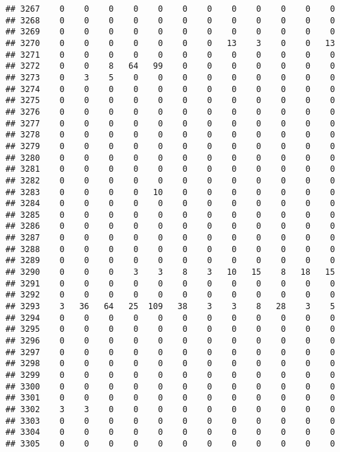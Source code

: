 \documentclass[]{article}
\begin{document}
\begin{verbatim}
## 3267    0    0    0    0    0    0    0    0    0    0    0    0
## 3268    0    0    0    0    0    0    0    0    0    0    0    0
## 3269    0    0    0    0    0    0    0    0    0    0    0    0
## 3270    0    0    0    0    0    0    0   13    3    0    0   13
## 3271    0    0    0    0    0    0    0    0    0    0    0    0
## 3272    0    0    8   64   99    0    0    0    0    0    0    0
## 3273    0    3    5    0    0    0    0    0    0    0    0    0
## 3274    0    0    0    0    0    0    0    0    0    0    0    0
## 3275    0    0    0    0    0    0    0    0    0    0    0    0
## 3276    0    0    0    0    0    0    0    0    0    0    0    0
## 3277    0    0    0    0    0    0    0    0    0    0    0    0
## 3278    0    0    0    0    0    0    0    0    0    0    0    0
## 3279    0    0    0    0    0    0    0    0    0    0    0    0
## 3280    0    0    0    0    0    0    0    0    0    0    0    0
## 3281    0    0    0    0    0    0    0    0    0    0    0    0
## 3282    0    0    0    0    0    0    0    0    0    0    0    0
## 3283    0    0    0    0   10    0    0    0    0    0    0    0
## 3284    0    0    0    0    0    0    0    0    0    0    0    0
## 3285    0    0    0    0    0    0    0    0    0    0    0    0
## 3286    0    0    0    0    0    0    0    0    0    0    0    0
## 3287    0    0    0    0    0    0    0    0    0    0    0    0
## 3288    0    0    0    0    0    0    0    0    0    0    0    0
## 3289    0    0    0    0    0    0    0    0    0    0    0    0
## 3290    0    0    0    3    3    8    3   10   15    8   18   15
## 3291    0    0    0    0    0    0    0    0    0    0    0    0
## 3292    0    0    0    0    0    0    0    0    0    0    0    0
## 3293    3   36   64   25  109   38    3    3    8   28    3    5
## 3294    0    0    0    0    0    0    0    0    0    0    0    0
## 3295    0    0    0    0    0    0    0    0    0    0    0    0
## 3296    0    0    0    0    0    0    0    0    0    0    0    0
## 3297    0    0    0    0    0    0    0    0    0    0    0    0
## 3298    0    0    0    0    0    0    0    0    0    0    0    0
## 3299    0    0    0    0    0    0    0    0    0    0    0    0
## 3300    0    0    0    0    0    0    0    0    0    0    0    0
## 3301    0    0    0    0    0    0    0    0    0    0    0    0
## 3302    3    3    0    0    0    0    0    0    0    0    0    0
## 3303    0    0    0    0    0    0    0    0    0    0    0    0
## 3304    0    0    0    0    0    0    0    0    0    0    0    0
## 3305    0    0    0    0    0    0    0    0    0    0    0    0

\end{verbatim}
\end{document}
